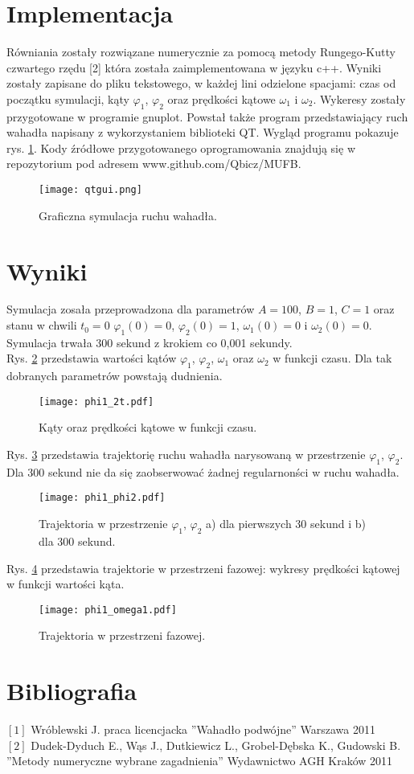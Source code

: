\documentclass[11pt]{aghdpl}
\begin{document}
\section{Implementacja}
Równiania zostały rozwiązane numerycznie za pomocą metody Rungego-Kutty czwartego rzędu [2] która została zaimplementowana w języku c++. Wyniki zostały zapisane do pliku tekstowego, w każdej lini odzielone spacjami: czas od początku symulacji, kąty $\varphi_1$, $\varphi_2$ oraz prędkości kątowe $\omega_1$ i $\omega_2$. Wykeresy zostały przygotowane w programie gnuplot. Powstał także program przedstawiający ruch wahadła napisany z wykorzystaniem biblioteki QT. Wygląd programu pokazuje rys. \ref{QTgui}. Kody źródłowe przygotowanego oprogramowania znajdują się w repozytorium pod adresem www.github.com/Qbicz/MUFB. 

\begin{figure}[h!]
	\centering
	\label{QTgui}
	\texttt{[image: qtgui.png]}
	\caption{Graficzna symulacja ruchu wahadła.}
\end{figure}

\section{Wyniki}
Symulacja zosała przeprowadzona dla parametrów $A = 100$, $B = 1$, $C = 1$ oraz stanu w chwili $t_0=0$ $\varphi_1(0) = 0$, $\varphi_2(0) = 1$, $\omega_1(0) = 0$ i $\omega_2(0) = 0$. Symulacja trwała 300 sekund z krokiem co 0,001 sekundy.  \\
Rys. \ref{phi1_2odt.} przedstawia wartości kątów $\varphi_1$, $\varphi_2$, $\omega_1$ oraz $\omega_2$ w funkcji czasu. Dla tak dobranych parametrów powstają dudnienia.
\begin{figure}[h!]
	\centering
	\label{phi1_2odt.}
	\texttt{[image: phi1\_2t.pdf]}
	\caption{Kąty oraz prędkości kątowe w funkcji czasu.}
\end{figure}
Rys. \ref{phi1_phi2.} przedstawia trajektorię ruchu wahadła narysowaną w przestrzenie $\varphi_1$, $\varphi_2$. Dla 300 sekund nie da się zaobserwować żadnej regularnonści w ruchu wahadła.
\begin{figure}[h!]
	\centering
	\label{phi1_phi2.}
	\texttt{[image: phi1\_phi2.pdf]}
	\caption{Trajektoria w przestrzenie $\varphi_1$, $\varphi_2$ a) dla pierwszych 30 sekund i b) dla 300 sekund.}
\end{figure}
Rys. \ref{phi_omega} przedstawia trajektorie w przestrzeni fazowej: wykresy prędkości kątowej w funkcji wartości kąta.
\begin{figure}[h!]
	\centering
	\label{phi_omega}
	\texttt{[image: phi1\_omega1.pdf]}
	\caption{Trajektoria w przestrzeni fazowej.}
\end{figure}




\section{Bibliografia}
$\qquad$ \\
$[1]$ Wróblewski J. praca licencjacka ''Wahadło podwójne'' Warszawa 2011\\
$[2]$ Dudek-Dyduch E., Wąs J., Dutkiewicz L., Grobel-Dębska K., Gudowski B. ''Metody numeryczne wybrane zagadnienia'' Wydawnictwo AGH Kraków 2011 
\end{document}
